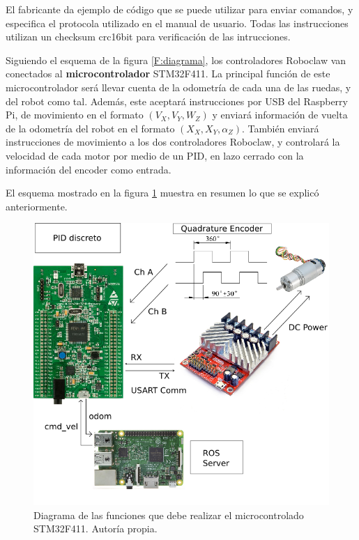 El fabricante da ejemplo de código que se puede utilizar para enviar comandos, y especifica el protocola utilizado en el manual de usuario. Todas las instrucciones utilizan un checksum crc16bit para verificación de las intrucciones.

Siguiendo el esquema de la figura \ref{F:diagrama}, los controladores Roboclaw van conectados al \textbf{microcontrolador} STM32F411. La principal función de este microcontrolador será llevar cuenta de la odometría de cada una de las ruedas, y del robot como tal. Además, este aceptará instrucciones por USB del Raspberry Pi, de movimiento en el formato $(V_X, V_Y, W_Z)$ y enviará información de vuelta de la odometría del robot en el formato $(X_X, X_Y, \alpha_Z)$. También enviará instrucciones de movimiento a los dos controladores Roboclaw, y controlará la velocidad de cada motor por medio de un PID, en lazo cerrado con la información del encoder como entrada.

El esquema mostrado en la figura \ref{F:diagrama_stm} muestra en resumen lo que se explicó anteriormente.

\begin{figure}[H]
\centering
\includegraphics[scale=0.5]{imagenes/microcontrolador_diagrama.png}
\caption{Diagrama de las funciones que debe realizar el microcontrolado STM32F411. Autoría propia.}
\label{F:diagrama_stm}
\end{figure}


